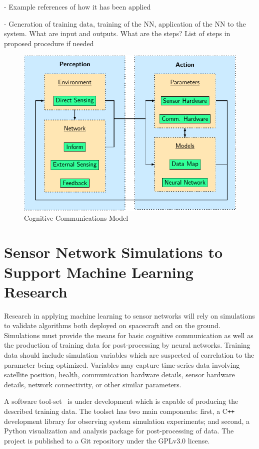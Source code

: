 \documentclass[conference]{IEEEtran}
\newcommand{\project}{{\sc{Collaborate}}~}
\newcommand{\cpp}{C\texttt{++}~}
\begin{document}
{
  \color{red}
  - Example references of how it has been applied

  - Generation of training data, training of the NN, application of the NN to
  the system. What are input and outputs. What are the steps? List of steps in
  proposed procedure if needed
}
\begin{figure}[t]
  \centerline{\includegraphics[width=0.9\linewidth]{images/working/flowchart.pdf}}
  \caption{Cognitive Communications Model}
  \label{fig:model}
\end{figure}

\vfill


\section{Sensor Network Simulations to Support Machine Learning Research}
\label{sec:software}

Research in applying machine learning to sensor networks will rely on
simulations to validate algorithms both deployed on spacecraft and on the
ground.  Simulations must provide the means for basic cognitive communication as
well as the production of training data for post-processing by neural networks.
Training data should include simulation variables which are suspected of
correlation to the parameter being optimized.  Variables may capture time-series
data involving satellite position, health, communication hardware details,
sensor hardware details, network connectivity, or other similar parameters.

A software tool-set \project is under development which is capable of producing
the described training data.  The toolset has two main components: first, a \cpp
development library for observing system simulation experiments; and second, a
Python visualization and analysis package for post-processing of data.  The
project is published to a Git repository under the GPLv3.0 license.
\end{document}
